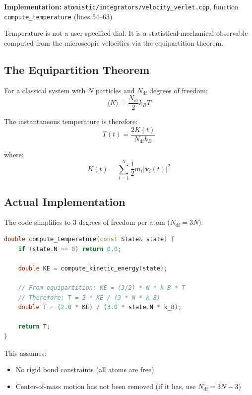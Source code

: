 \documentclass[11pt]{article}
\begin{document}
\textbf{Implementation:} \texttt{atomistic/integrators/velocity\_verlet.cpp}, function \texttt{compute\_temperature} (lines 54--63)

Temperature is not a user-specified dial. It is a statistical-mechanical observable computed from the microscopic velocities via the equipartition theorem.

\subsection{The Equipartition Theorem}

For a classical system with $N$ particles and $N_{\text{df}}$ degrees of freedom:
\begin{equation}
\langle K \rangle = \frac{N_{\text{df}}}{2} k_B T
\end{equation}

The instantaneous temperature is therefore:
\begin{equation}
T(t) = \frac{2 K(t)}{N_{\text{df}} k_B}
\end{equation}

where:
\begin{equation}
K(t) = \sum_{i=1}^{N} \frac{1}{2} m_i |\mathbf{v}_i(t)|^2
\end{equation}

\subsection{Actual Implementation}

The code simplifies to 3 degrees of freedom per atom ($N_{\text{df}} = 3N$):

\begin{lstlisting}[language=C++]
double compute_temperature(const State& state) {
    if (state.N == 0) return 0.0;
    
    double KE = compute_kinetic_energy(state);
    
    // From equipartition: KE = (3/2) * N * k_B * T
    // Therefore: T = 2 * KE / (3 * N * k_B)
    double T = (2.0 * KE) / (3.0 * state.N * k_B);
    
    return T;
}
\end{lstlisting}

This assumes:
\begin{itemize}
\item No rigid bond constraints (all atoms are free)
\item Center-of-mass motion has not been removed (if it has, use $N_{\text{df}} = 3N - 3$)
\end{itemize}
\end{document}
